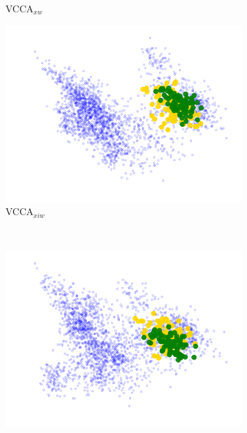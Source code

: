\begin{figure}[t]
\begin{subfigure}[b]{0.3\textwidth}
         \caption{VCCA$_{x w}$}
         \label{fig:pca_vcca_xw_juice_yoghurt}
     \end{subfigure} 
     \begin{subfigure}[b]{0.3\textwidth}
         \centering
         \includegraphics[width=\textwidth]{figures_and_tables/latent_space_visualizations/juice_yoghurt_new/pca_latent_juice_yoghurt_vcca_xiw_seed2.png}
         \caption{VCCA$_{x i w}$}
         \label{fig:pca_vcca_xiw_juice_yoghurt}
     \end{subfigure} \\
     \begin{subfigure}[b]{0.3\textwidth}
         \centering
         \includegraphics[width=\textwidth]{figures_and_tables/latent_space_visualizations/juice_yoghurt_new/pca_latent_juice_yoghurt_vcca_xiy_seed2.png}

\end{subfigure}
\end{figure}
